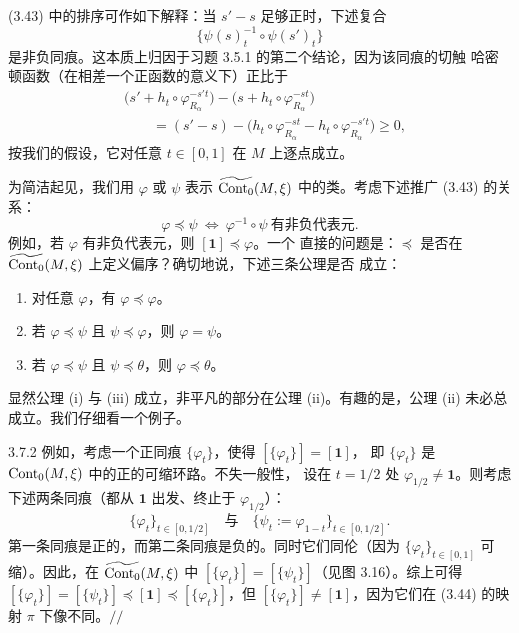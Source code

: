 (3.43) 中的排序可作如下解释：当 $s'-s$ 足够正时，下述复合
\[
  \bigl\{\psi(s)_t^{-1}\circ\psi(s')_t\bigr\}
\]
是非负同痕。这本质上归因于习题 3.5.1 的第二个结论，因为该同痕的切触
哈密顿函数（在相差一个正函数的意义下）正比于
\begin{align*}
  &\bigl(s'+h_t\circ\varphi_{R_\alpha}^{-s't}\bigr)
  -\bigl(s+h_t\circ\varphi_{R_\alpha}^{-st}\bigr)\\
  &\qquad=(s'-s)
  -\bigl(h_t\circ\varphi_{R_\alpha}^{-st}
  -h_t\circ\varphi_{R_\alpha}^{-s't}\bigr)\ge0,
\end{align*}
按我们的假设，它对任意 $t\in[0,1]$ 在 $M$ 上逐点成立。

为简洁起见，我们用 $\varphi$ 或 $\psi$ 表示
$\widetilde{\operatorname{Cont}_0}(M,\xi)$ 中的类。考虑下述推广 (3.43) 的关系：
\begin{equation}\tag{3.45}
  \varphi\preceq\psi
  \ \Longleftrightarrow\
  \varphi^{-1}\circ\psi\ \text{有非负代表元}.
\end{equation}
例如，若 $\varphi$ 有非负代表元，则 $[\mathbf{1}]\preceq\varphi$。一个
直接的问题是：$\preceq$ 是否在
$\widetilde{\operatorname{Cont}_0}(M,\xi)$ 上定义偏序？确切地说，下述三条公理是否
成立：
\begin{enumerate}[label=(\roman*)]
  \item 对任意 $\varphi$，有 $\varphi\preceq\varphi$。
  \item 若 $\varphi\preceq\psi$ 且 $\psi\preceq\varphi$，则 $\varphi=\psi$。
  \item 若 $\varphi\preceq\psi$ 且 $\psi\preceq\theta$，则
        $\varphi\preceq\theta$。
\end{enumerate}
显然公理 (i) 与 (iii) 成立，非平凡的部分在公理 (ii)。有趣的是，公理 (ii)
未必总成立。我们仔细看一个例子。

\begin{wexam}{3.7.2}
例如，考虑一个正同痕 $\{\varphi_t\}$，使得 $[\{\varphi_t\}]=[\mathbf{1}]$，
即 $\{\varphi_t\}$ 是 $\operatorname{Cont}_0(M,\xi)$ 中的正的可缩环路。不失一般性，
设在 $t=1/2$ 处 $\varphi_{1/2}\neq\mathbf{1}$。则考虑下述两条同痕（都从
$\mathbf{1}$ 出发、终止于 $\varphi_{1/2}$）：
\[
  \{\varphi_t\}_{t\in[0,1/2]}
  \quad\text{与}\quad
  \{\psi_t:=\varphi_{1-t}\}_{t\in[0,1/2]}.
\]
第一条同痕是正的，而第二条同痕是负的。同时它们同伦（因为
$\{\varphi_t\}_{t\in[0,1]}$ 可缩）。因此，在
$\widetilde{\operatorname{Cont}_0}(M,\xi)$ 中
$[\{\varphi_t\}]=[\{\psi_t\}]$（见图 3.16）。综上可得
$[\{\varphi_t\}]=[\{\psi_t\}]\preceq[\mathbf{1}]
\preceq[\{\varphi_t\}]$，但 $[\{\varphi_t\}]\neq[\mathbf{1}]$，因为它们在
(3.44) 的映射 $\pi$ 下像不同。\hfill$//$
\end{wexam}

